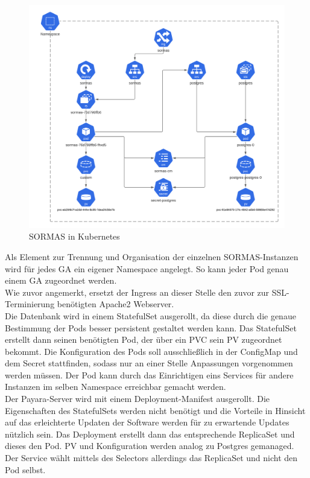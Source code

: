 \begin{figure}[h!]
\centering    
\includegraphics[width=\textwidth]{bilder/sormas_kubernetes.png}
\caption{SORMAS in Kubernetes}
\label{fig:sormas_kubernetes}
\end{figure}

Als Element zur Trennung und Organisation der einzelnen \ac{SORMAS}-Instanzen wird für jedes \ac{GA} ein eigener Namespace angelegt.
So kann jeder Pod genau einem \ac{GA} zugeordnet werden.\\
Wie zuvor angemerkt, ersetzt der Ingress an dieser Stelle den zuvor zur \ac{SSL}-Terminierung benötigten Apache2 Webserver.\\
Die Datenbank wird in einem StatefulSet ausgerollt, da diese durch die genaue Bestimmung der Pods besser persistent gestaltet werden kann.
Das StatefulSet erstellt dann seinen benötigten Pod, der über ein \ac{PVC} sein \ac{PV} zugeordnet bekommt. 
Die Konfiguration des Pods soll ausschließlich in der ConfigMap und dem Secret stattfinden, sodass nur an einer Stelle Anpassungen vorgenommen werden müssen.
Der Pod kann durch das Einrichtigen eins Services für andere Instanzen im selben Namespace erreichbar gemacht werden.\\
Der Payara-Server wird mit einem Deployment-Manifest ausgerollt. 
Die Eigenschaften des StatefulSets werden nicht benötigt und die Vorteile in Hinsicht auf das erleichterte Updaten der Software werden für zu erwartende Updates nützlich sein.
Das Deployment erstellt dann das entsprechende ReplicaSet und dieses den Pod. 
\ac{PV} und Konfiguration werden analog zu Postgres gemanaged. 
Der Service wählt mittels des Selectors allerdings das ReplicaSet und nicht den Pod selbst.


